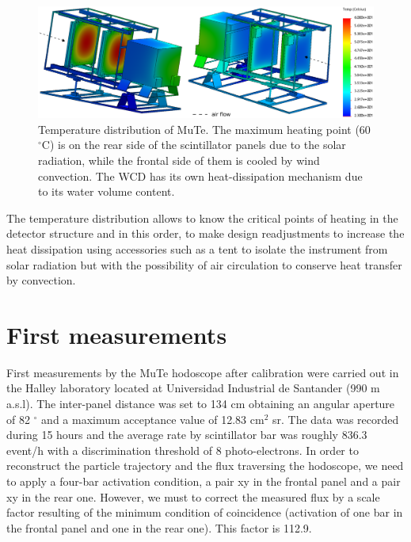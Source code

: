 \documentclass[letterpaper,11pt]{article}
\begin{document}
\begin{figure}[htb]
\centering
\includegraphics[width=1\columnwidth]{Figures/MuTe_Temp.eps}
\caption{Temperature distribution of MuTe. The maximum heating point (60 $^{\circ}$C) is on the rear side of the scintillator panels due to the solar radiation, while the frontal side of them is cooled by wind convection. The WCD has its own heat-dissipation mechanism due to its water volume content.}
\label{fig:temp_graph}
\end{figure}

The temperature distribution allows to know the critical points of heating in the detector structure and in this order, to make design readjustments to increase the heat dissipation using accessories such as a tent to isolate the instrument from solar radiation but with the possibility of air circulation to conserve heat transfer by convection. 

\section{First measurements}
\label{measurement}

First measurements by the MuTe hodoscope after calibration were carried out in the Halley laboratory located at Universidad Industrial de Santander (990 m a.s.l). The inter-panel distance was set to 134 cm obtaining an angular aperture of 82 $^{\circ}$ and a maximum acceptance value of 12.83 cm$^{2}$ sr. The data was recorded during 15 hours and the average rate by scintillator bar was roughly 836.3 event/h with a discrimination threshold of 8 photo-electrons. In order to reconstruct the particle trajectory and the flux traversing the hodoscope, we need to apply a four-bar activation condition, a pair xy in the frontal panel and a pair xy in the rear one. However, we must to correct the measured flux by a scale factor resulting of the minimum condition of coincidence (activation of one bar in the frontal panel and one in the rear one). This factor is 112.9. 
\end{document}
